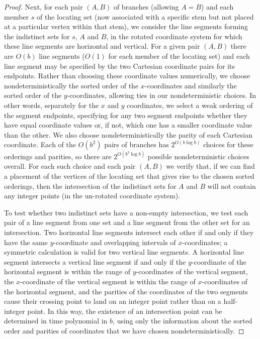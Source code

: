 \documentclass{jgaa-art}
\begin{document}
\begin{proof}
Next, for each pair $(A,B)$ of branches (allowing $A=B$) and each member $s$ of the locating set (now associated with a specific stem but not placed at a particular vertex within that stem), we consider the line segments forming the indistinct sets for $s$, $A$ and $B$, in the rotated coordinate system for which these line segments are horizontal and vertical. For a given pair $(A,B)$ there are $O(b)$ line segments ($O(1)$ for each member of the locating set) and each line segment may be specified by the two Cartesian coordinate pairs for its endpoints. Rather than choosing these coordinate values numerically, we choose nondeterministically the sorted order of the $x$-coordinates and similarly the sorted order of the $y$-coordinates, allowing ties in our nondeterministic choices. In other words, separately for the $x$ and $y$ coordinates, we select a weak ordering of the segment endpoints, specifying for any two segment endpoints whether they have equal coordinate values or, if not, which one has a smaller coordinate value than the other.
We also choose nondeterministically the parity of each Cartesian coordinate.
Each of the $O(b^2)$ pairs of branches has $2^{O(b\log b)}$ choices for these orderings and parities, so there are $2^{O(b^3\log b)}$ possible nondeterministic choices overall.
For each such choice and each pair $(A,B)$ we verify that, if we can find a placement of the vertices of the locating set that gives rise to the chosen sorted orderings, then the intersection of the indistinct sets for $A$ and $B$ will not contain any integer points (in the un-rotated coordinate system).

To test whether two indistinct sets have a non-empty intersection, we test each pair of a line segment from one set and a line segment from the other set for an intersection.
Two horizontal line segments intersect each other if and only if they have the same $y$-coordinate and overlapping intervals of $x$-coordinates; a symmetric calculation is valid for two vertical line segments. A horizontal line segment intersects a vertical line segment if and only if the $y$-coordinate of the horizontal segment is within the range of $y$-coordinates of the vertical segment, the $x$-coordinate of the vertical segment is within the range of $x$-coordinates of the horizontal segment, and the parities of the coordinates of the two segments cause their crossing point to land on an integer point rather than on a half-integer point. In this way, the existence of an intersection point can be determined in time polynomial in $b$, using only the information about the sorted order and parities of coordinates that we have chosen nondeterministically.


\end{proof}
\end{document}
